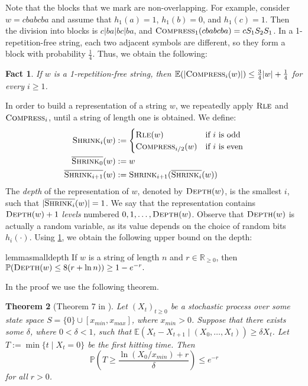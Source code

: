 \documentclass[a4paper]{article}
\newtheorem{theorem}{Theorem}[section]
\newtheorem{fact}[theorem]{Fact}
\theoremstyle{remark}
\newcommand{\compress}{\textsc{Compress}}
\newcommand{\depth}{\textsc{Depth}}
\newcommand{\rle}{\textsc{Rle}}
\newcommand{\shrink}[1]{\ensuremath{\textsc{Shrink}_{#1}}}
\newcommand{\cshrink}[1]{\ensuremath{\overline{\textsc{Shrink}_{#1}}}}
\newcommand{\str}{w}
\newcommand{\hs}{h}
\begin{document}
Note that the blocks that we mark are non-overlapping.
For example, consider $\str = cbabcba$ and assume that $\hs_1(a) = 1$, $\hs_1(b) = 0$, and $\hs_1(c) = 1$.
Then the division into blocks is $c|ba|bc|ba$, and $\compress_1(cbabcba) = cS_1S_2S_1$.
In a 1-repetition-free string, each two adjacent symbols are different, so they form a block with probability $\frac14$.
Thus, we obtain the following:
\begin{fact}\label{lem:compress}
If $\str$ is a 1-repetition-free string, then $\mathbb{E}(|\compress_i(\str)|) \leq \frac{3}{4} |\str| + \frac14$ for every $i \geq 1$.
\end{fact}

In order to build a representation of a string $\str$, we repeatedly apply $\rle{}$ and $\compress_i{}$, until a string of length one is obtained.
We define:
\begin{align*}
\shrink{i}(\str) & := \begin{cases}
\rle(\str) & \text{if $i$ is odd} \\
\compress_{i/2}(\str) & \text{if $i$ is even}
\end{cases}\\
\cshrink{0}(\str) & := \str\\
\cshrink{i+1}(\str) & := \shrink{i+1}(\cshrink{i}(\str))
\end{align*}
The \emph{depth} of the representation of $\str$, denoted by $\depth(\str)$, is the smallest $i$, such that $|\cshrink{i}(w)| = 1$.
We say that the representation contains $\depth(\str)+1$ \emph{levels} numbered $0, 1, \ldots, \depth(\str)$.
Observe that $\depth(\str)$ is actually a random variable, as its value depends on the choice of random bits $\hs_i(\cdot)$.
Using \cref{lem:compress}, we obtain the following upper bound on the depth:

\begin{restatable}{lemma}{smalldepth}\label{lem:small_depth}
If $\str$ is a string of length $n$ and $r\in \mathbb{R}_{\ge 0}$, then
$\mathbb{P}(\depth(\str) \leq 8(r + \ln n)) \geq 1 - e^{-r}.$
\end{restatable}
In the proof we use the following theorem.

\begin{theorem}[Theorem 7 in \cite{Lehre:2013}]\label{thm:drift}
Let $(X_t)_{t \geq 0}$ be a stochastic process over some state space $S = \{0\} \cup [x_{min}, x_{max}]$, where $x_{min} > 0$.
Suppose that there exists some $\delta$, where $0 < \delta < 1$, such that $\mathbb{E}(X_t - X_{t+1} \mid (X_0, \ldots, X_t)) \geq \delta X_t$.
Let $T:= \min\{t \mid X_t = 0\}$ be the first hitting time.
Then $$\mathbb{P}\left(T \geq \frac{\ln (X_0 / x_{min}) + r}{\delta}\right) \leq e^{-r}$$ for all $r > 0$.
\end{theorem}
\end{document}

